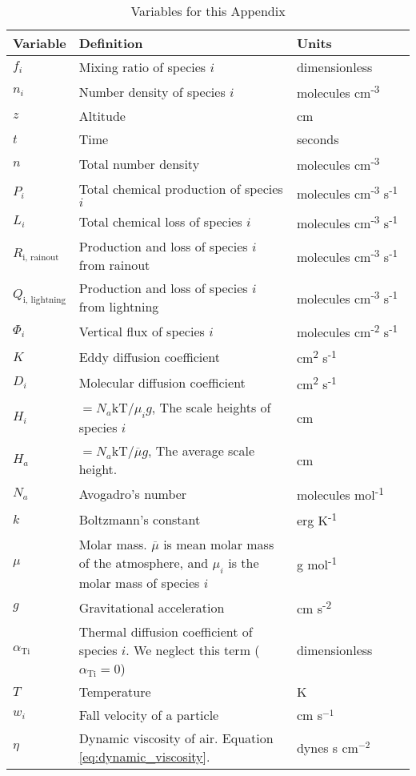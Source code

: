 \begin{table}
  \centering
  \begin{tabularx}{\linewidth}{p{0.15\linewidth} | p{0.55\linewidth} | p{0.3\linewidth}} \caption{Variables for this Appendix} \label{tab:appendix_variables} \\
  \hline \hline
  Variable & Definition & Units \\
  \hline
  \(f_{i}\) & Mixing ratio of species \(i\) & dimensionless \\
  \(n_{i}\) & Number density of species \(i\) & molecules
  cm\textsuperscript{-3} \\
  \(z\) & Altitude & cm \\
  \(t\) & Time & seconds \\
  \(n\) & Total number density & molecules
  cm\textsuperscript{-3} \\
  \(P_{i}\) & Total chemical production of species \(i\) & molecules
  cm\textsuperscript{-3} s\textsuperscript{-1} \\
  \(L_{i}\) & Total chemical loss of species \(i\) & molecules
  cm\textsuperscript{-3} s\textsuperscript{-1} \\
  \(R_{\text{i, rainout}}\) & Production and loss of species \(i\) from
  rainout & molecules cm\textsuperscript{-3}
  s\textsuperscript{-1} \\
  \(Q_{\text{i, lightning}}\) & Production and loss of species \(i\)
  from lightning & molecules cm\textsuperscript{-3}
  s\textsuperscript{-1} \\
  \(\Phi_{i}\) & Vertical flux of species \(i\) & molecules
  cm\textsuperscript{-2} s\textsuperscript{-1} \\
  \(K\) & Eddy diffusion coefficient & cm\textsuperscript{2}
  s\textsuperscript{-1} \\
  \(D_{i}\) & Molecular diffusion coefficient & cm\textsuperscript{2}
  s\textsuperscript{-1} \\
  \(H_{i}\) & \(= N_{a}\text{kT}\text{/}\mu_{i}g\), The scale heights of
  species \(i\) & cm \\
  \(H_{a}\) & \(= N_{a}\text{kT}\text{/}\overline{\mu}g\), The average
  scale height. & cm \\
  \(N_{a}\) & Avogadro's number & molecules
  mol\textsuperscript{-1} \\
  \(k\) & Boltzmann's constant & erg K\textsuperscript{-1} \\
  \(\mu\) & Molar mass. \(\overline{\mu}\) is mean molar mass of the
  atmosphere, and \(\mu_{i}\) is the molar mass of species \(i\) & g
  mol\textsuperscript{-1} \\
  \(g\) & Gravitational acceleration & cm
  s\textsuperscript{-2} \\
  \(\alpha_{\text{Ti}}\) & Thermal diffusion coefficient of species \(i\).
  We neglect this term (\(\alpha_{\text{Ti}} = 0\)) &
  dimensionless \\
  \(T\) & Temperature & K \\
  $w_i$ & Fall velocity of a particle & cm s$^{-1}$ \\
  $\eta$ & Dynamic viscosity of air. Equation \eqref{eq:dynamic_viscosity}. & dynes s cm$^{-2}$ \\
  \end{tabularx}
\end{table}